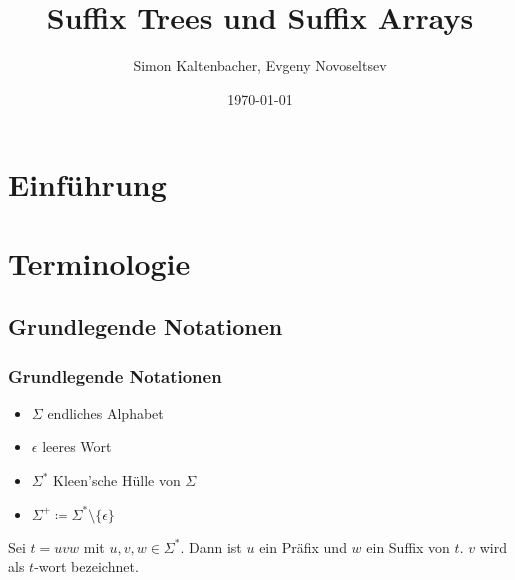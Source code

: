 \documentclass{beamer}
\title{Suffix Trees und Suffix Arrays}
\author{Simon Kaltenbacher, Evgeny Novoseltsev}
\date{\today}
\begin{document}
\frame{\titlepage}


\section{Einführung}

\section{Terminologie}

\subsection{Grundlegende Notationen}

\begin{frame}
    \frametitle{Grundlegende Notationen}
    \begin{itemize}
        \item $\Sigma$ endliches Alphabet
        \item $\epsilon$ leeres Wort
        \item $\Sigma^*$ Kleen'sche Hülle von $\Sigma$
        \item $\Sigma^+ \coloneqq \Sigma^* \setminus \{\epsilon\}$ 
    \end{itemize}
    \begin{definition}
        Sei $t = uvw$ mit $u, v, w \in \Sigma^*$. Dann ist $u$ ein Präfix und $w$ ein Suffix von $t$. $v$ wird als $t$-wort bezeichnet.
    \end{definition}
\end{frame}

\end{document}
